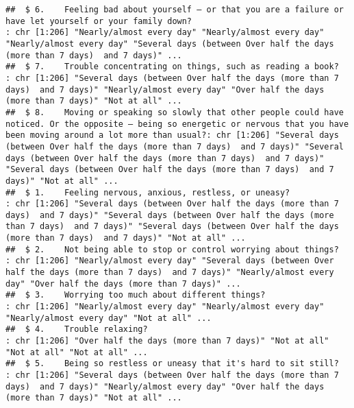 \documentclass[
]{article}
\begin{document}
\begin{verbatim}
##  $ 6.    Feeling bad about yourself – or that you are a failure or have let yourself or your family down?                                                                          : chr [1:206] "Nearly/almost every day" "Nearly/almost every day" "Nearly/almost every day" "Several days (between Over half the days (more than 7 days)  and 7 days)" ...
##  $ 7.    Trouble concentrating on things, such as reading a book?                                                                                                                  : chr [1:206] "Several days (between Over half the days (more than 7 days)  and 7 days)" "Nearly/almost every day" "Over half the days (more than 7 days)" "Not at all" ...
##  $ 8.    Moving or speaking so slowly that other people could have noticed. Or the opposite — being so energetic or nervous that you have been moving around a lot more than usual?: chr [1:206] "Several days (between Over half the days (more than 7 days)  and 7 days)" "Several days (between Over half the days (more than 7 days)  and 7 days)" "Several days (between Over half the days (more than 7 days)  and 7 days)" "Not at all" ...
##  $ 1.    Feeling nervous, anxious, restless, or uneasy?                                                                                                                            : chr [1:206] "Several days (between Over half the days (more than 7 days)  and 7 days)" "Several days (between Over half the days (more than 7 days)  and 7 days)" "Several days (between Over half the days (more than 7 days)  and 7 days)" "Not at all" ...
##  $ 2.    Not being able to stop or control worrying about things?                                                                                                                  : chr [1:206] "Nearly/almost every day" "Several days (between Over half the days (more than 7 days)  and 7 days)" "Nearly/almost every day" "Over half the days (more than 7 days)" ...
##  $ 3.    Worrying too much about different things?                                                                                                                                 : chr [1:206] "Nearly/almost every day" "Nearly/almost every day" "Nearly/almost every day" "Not at all" ...
##  $ 4.    Trouble relaxing?                                                                                                                                                         : chr [1:206] "Over half the days (more than 7 days)" "Not at all" "Not at all" "Not at all" ...
##  $ 5.    Being so restless or uneasy that it's hard to sit still?                                                                                                                  : chr [1:206] "Several days (between Over half the days (more than 7 days)  and 7 days)" "Nearly/almost every day" "Over half the days (more than 7 days)" "Not at all" ...

\end{verbatim}
\end{document}
